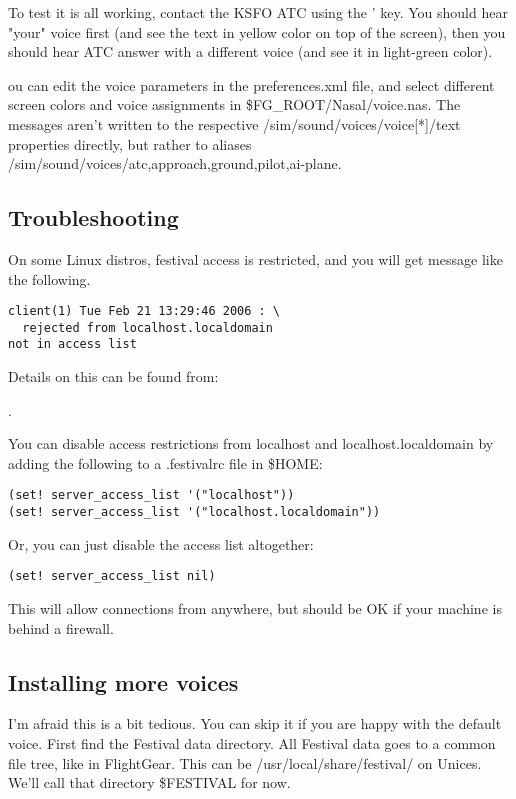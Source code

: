 To test it is all working, contact the KSFO ATC using the ' key. You should hear "your"
voice first (and see the text in yellow color on top of the screen), then you should hear
ATC answer with a different voice (and see it in light-green color).

ou can edit the voice parameters in the preferences.xml file, and select different screen colors
and voice assignments in \$FG\_ROOT/Nasal/voice.nas. The messages aren't written to the
respective /sim/sound/voices/voice[*]/text properties directly, but rather to aliases
/sim/sound/voices/{atc,approach,ground,pilot,ai-plane}.

\subsection{Troubleshooting}

On some Linux distros, festival access is restricted, and you will get message like the following.

\begin{verbatim}
client(1) Tue Feb 21 13:29:46 2006 : \
  rejected from localhost.localdomain
not in access list
\end{verbatim}

Details on this can be found from:

.

You can disable access restrictions from localhost and localhost.localdomain by adding
the following to a .festivalrc file in \$HOME:
\begin{verbatim}
(set! server_access_list '("localhost"))
(set! server_access_list '("localhost.localdomain"))
\end{verbatim}

Or, you can just disable the access list altogether:

\begin{verbatim}
(set! server_access_list nil)
\end{verbatim}

This will allow connections from anywhere, but should be OK if your machine is behind a
firewall.

\subsection{Installing more voices}

I'm afraid this is a bit tedious. You can skip it if you are happy with the default voice.
First find the Festival data directory. All Festival data goes to a common file tree,
like in FlightGear. This can be /usr/local/share/festival/ on Unices. We'll call that
directory \$FESTIVAL for now.

